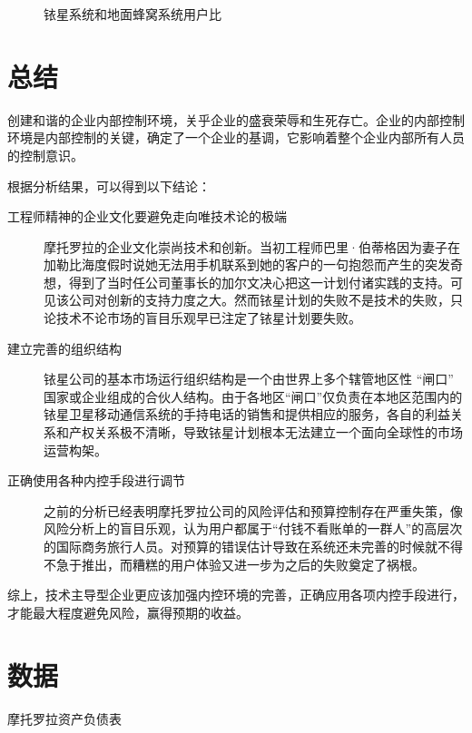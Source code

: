 \documentclass{ctexart}
\begin{document}
\begin{figure}[htpb]
	\centering
	\caption{铱星系统和地面蜂窝系统用户比}
	\label{fig:铱星系统和地面蜂窝系统用户比}
\end{figure}

\section{总结}%
\label{sec:总结}

创建和谐的企业内部控制环境，关乎企业的盛衰荣辱和生死存亡。企业的内部控制环境是内部控制的关键，确定了一个企业的基调，它影响着整个企业内部所有人员的控制意识。

根据分析结果，可以得到以下结论：

\begin{description}
	\item[工程师精神的企业文化要避免走向唯技术论的极端]摩托罗拉的企业文化崇尚技术和创新。当初工程师巴里·伯蒂格因为妻子在加勒比海度假时说她无法用手机联系到她的客户的一句抱怨而产生的突发奇想，得到了当时任公司董事长的加尔文决心把这一计划付诸实践的支持。可见该公司对创新的支持力度之大。然而铱星计划的失败不是技术的失败，只论技术不论市场的盲目乐观早已注定了铱星计划要失败。
	\item[建立完善的组织结构]铱星公司的基本市场运行组织结构是一个由世界上多个辖管地区性 \enquote{闸口} 国家或企业组成的合伙人结构。由于各地区\enquote{闸口}仅负责在本地区范围内的铱星卫星移动通信系统的手持电话的销售和提供相应的服务，各自的利益关系和产权关系极不清晰，导致铱星计划根本无法建立一个面向全球性的市场运营构架。 \cite{杨有红2004试论公司治理与内部控制的对接}
	\item[正确使用各种内控手段进行调节]之前的分析已经表明摩托罗拉公司的风险评估和预算控制存在严重失策，像风险分析上的盲目乐观，认为用户都属于“付钱不看账单的一群人”的高层次的国际商务旅行人员。对预算的错误估计导致在系统还未完善的时候就不得不急于推出，而糟糕的用户体验又进一步为之后的失败奠定了祸根。
\end{description}

综上，技术主导型企业更应该加强内控环境的完善，正确应用各项内控手段进行，才能最大程度避免风险，赢得预期的收益。






\appendix

\section{数据}%
\label{sec:数据}

\begin{table}[htpb]
	\centering
	\caption{摩托罗拉资产负债表}
	\label{tab:摩托罗拉资产负债表}
\end{table}
\end{document}
